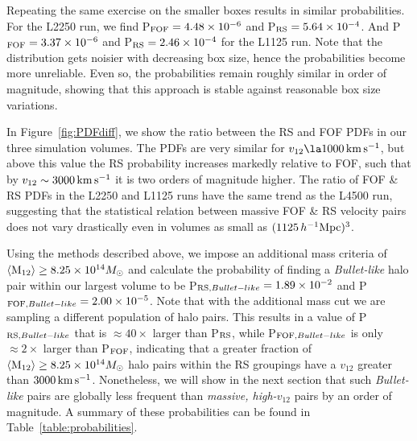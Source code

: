 \documentclass[useAMS, usenatbib]{mn2e}
\newcommand{\Msun}{M_{\odot}}
\newcommand{\hinv}{h^{-1}}
\newcommand{\vonetwo}{v_{12}}
\newcommand{\kms}{\,\rm{km}\,\rm{s}^{-1}}
\begin{document}
Repeating the same exercise on the smaller boxes results in similar
probabilities.  For the L2250 run, we find P$_{\rm{FOF}}=4.48\times10^{-6}$
and P$_{\rm{RS}}=5.64\times10^{-4}$.  And P$_{\rm{FOF}}=3.37\times10^{-6}$
and P$_{\rm{RS}}=2.46\times10^{-4}$ for the L1125 run.  Note that
the distribution gets noisier with decreasing box size, hence the
probabilities become more unreliable.  Even so, the probabilities
remain roughly similar in order of magnitude, showing that this approach
is stable against reasonable box size variations.

In Figure~\ref{fig:PDFdiff}, we show the ratio between the RS and
FOF PDFs in our three simulation volumes.  The PDFs are very similar
for $\vonetwo\la 1000\kms$, but above this value the RS probability
increases markedly relative to FOF, such that by $\vonetwo\sim
3000\kms$ it is two orders of magnitude higher.  The ratio of FOF
\& RS PDFs in the L2250 and L1125 runs have the same trend as the
L4500 run, suggesting that the statistical relation between massive
FOF \& RS velocity pairs does not vary drastically even in volumes
as small as $(1125\,\hinv {\rm Mpc})^3$.

Using the methods described above, we impose an additional mass criteria of $\left<\rm{M}_{12}\right>\geq8.25\times10^{14}\Msun$ and calculate the probability of finding a {\it Bullet-like} halo pair 
within our largest volume to be P$_{{\rm RS},Bullet-like}=1.89\times10^{-2}$ and P$_{{\rm FOF},Bullet-like}=2.00\times10^{-5}$.
Note that with the additional mass cut we are sampling a different population of halo pairs.
This results in a value of P$_{{\rm RS},Bullet-like}$ that is $\approx40\times$ larger than P$_{\rm{RS}}$, while P$_{{\rm FOF},Bullet-like}$ is only $\approx2\times$ larger than  P$_{\rm{FOF}}$, indicating that a greater fraction of $\left<\rm{M}_{12}\right>\geq8.25\times10^{14}\Msun$ halo pairs within the RS groupings have a $\vonetwo$ greater than $3000\kms$.
Nonetheless, we will show in the next section that such {\it Bullet-like} pairs are globally less frequent than {\it massive, high-$\vonetwo$} pairs by an order of magnitude.
A summary of these probabilities can be found in Table~\ref{table:probabilities}.
\end{document}
